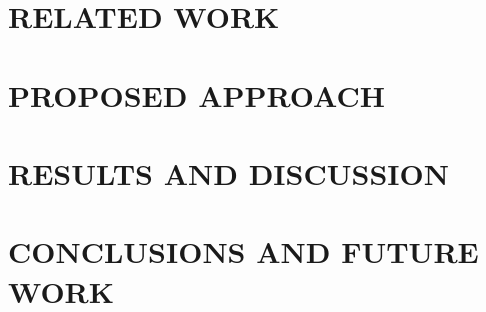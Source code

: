 \documentclass[letterpaper, 10 pt, conference]{ieeeconf}  %
\begin{document}
\section{RELATED WORK}
\label{sec:related}


\section{PROPOSED APPROACH}
\label{sec:proposed}






\section{RESULTS AND DISCUSSION}
\label{sec:results}


\section{CONCLUSIONS AND FUTURE WORK}
\label{sec:conclusions}







\end{document}
